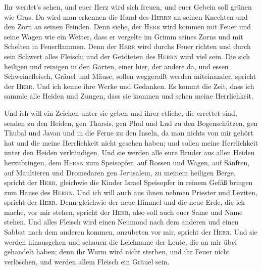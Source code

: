  Ihr werdet's sehen, und euer Herz wird sich freuen, und
euer Gebein soll grünen wie Gras. Da wird man erkennen die Hand des
\textsc{Herrn} an seinen Knechten und den Zorn an seinen Feinden.
 Denn siehe, der \textsc{Herr} wird kommen mit Feuer und
seine Wagen wie ein Wetter, dass er vergelte im Grimm seines Zorns und
mit Schelten in Feuerflammen.  Denn der \textsc{Herr}
wird durchs Feuer richten und durch sein Schwert alles Fleisch; und der
Getöteten des \textsc{Herrn} wird viel sein.  Die sich
heiligen und reinigen in den Gärten, einer hier, der andere da, und
essen Schweinefleisch, Gräuel und Mäuse, sollen weggerafft werden
miteinander, spricht der \textsc{Herr}.  Und ich kenne
ihre Werke und Gedanken. Es kommt die Zeit, dass ich sammle alle Heiden
und Zungen, dass sie kommen und sehen meine Herrlichkeit.

 Und ich will ein Zeichen unter sie geben und ihrer
etliche, die errettet sind, senden zu den Heiden, gen Tharsis, gen Phul
und Lud zu den Bogenschützen, gen Thubal und Javan und in die Ferne zu
den Inseln, da man nichts von mir gehört hat und die meine Herrlichkeit
nicht gesehen haben; und sollen meine Herrlichkeit unter den Heiden
verkündigen.  Und sie werden alle eure Brüder aus allen
Heiden herzubringen, dem \textsc{Herrn} zum Speisopfer, auf Rossen und
Wagen, auf Sänften, auf Maultieren und Dromedaren gen Jerusalem, zu
meinem heiligen Berge, spricht der \textsc{Herr}, gleichwie die Kinder
Israel Speisopfer in reinem Gefäß bringen zum Hause des \textsc{Herrn}.
 Und ich will auch aus ihnen nehmen Priester und Leviten,
spricht der \textsc{Herr}.  Denn gleichwie der neue
Himmel und die neue Erde, die ich mache, vor mir stehen, spricht der
\textsc{Herr}, also soll auch euer Same und Name stehen. 
Und alles Fleisch wird einen Neumond nach dem anderen und einen Sabbat
nach dem anderen kommen, anzubeten vor mir, spricht der \textsc{Herr}.
 Und sie werden hinausgehen und schauen die Leichname der
Leute, die an mir übel gehandelt haben; denn ihr Wurm wird nicht
sterben, und ihr Feuer nicht verlöschen, und werden allem Fleisch ein
Gräuel sein.
